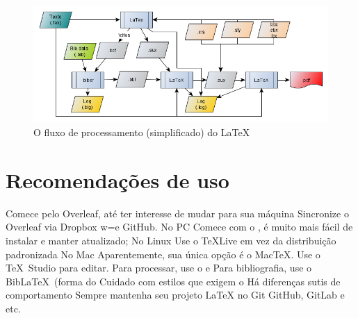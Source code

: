 \begin{figure}[hbt]
    \centering
    \includegraphics[width=0.8\linewidth]{"Images/LaTeX processing flow"}
    \caption{O fluxo de processamento (simplificado) do \LaTeX}
    \label{fig:latex-processing-flow}
\end{figure}

\section{Recomendações de uso}

    \begin{outline}
    \1 Comece pelo Overleaf, até ter interesse de mudar para sua máquina
    \1 Sincronize o Overleaf via Dropbox w=e GitHub. 
    \1 No PC
    \2 Comece com o , é muito mais fácil de instalar e manter
    atualizado;
    \1 No Linux
    \2 Use o \TeX Live em vez da distribuição padronizada
    \1 No Mac
    \2 Aparentemente, sua única opção é o Mac\TeX.
    \1 Use o \TeX\ Studio para editar.
    \1 Para processar, use o  e 
    \1 Para bibliografia, use o Bib\LaTeX\ (forma do  
    \2 Cuidado com estilos que exigem o 
    \2 Há diferenças sutis de comportamento
    \1 Sempre mantenha seu projeto \LaTeX{}  no Git
    \2 GitHub, GitLab e etc.
\end{outline}

